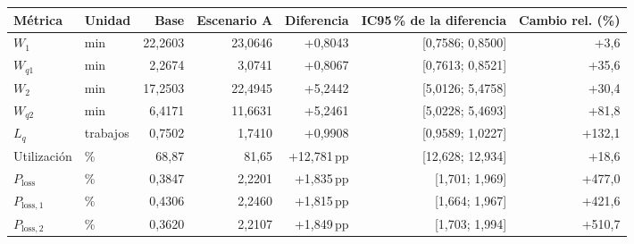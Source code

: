 \begin{tabular}{llrrrrr}
\toprule
Métrica & Unidad & Base & Escenario A & Diferencia & IC95\,\% de la diferencia & Cambio rel. (\%) \\
\midrule
$W_1$ & min & 22,2603 & 23,0646 & +0,8043 & [0,7586; 0,8500] & +3,6 \\
$W_{q1}$ & min & 2,2674 & 3,0741 & +0,8067 & [0,7613; 0,8521] & +35,6 \\
$W_2$ & min & 17,2503 & 22,4945 & +5,2442 & [5,0126; 5,4758] & +30,4 \\
$W_{q2}$ & min & 6,4171 & 11,6631 & +5,2461 & [5,0228; 5,4693] & +81,8 \\
$L_q$ & trabajos & 0,7502 & 1,7410 & +0,9908 & [0,9589; 1,0227] & +132,1 \\
Utilización & \% & 68,87 & 81,65 & +12,781\,pp & [12,628; 12,934] & +18,6 \\
$P_{\text{loss}}$ & \% & 0,3847 & 2,2201 & +1,835\,pp & [1,701; 1,969] & +477,0 \\
$P_{\text{loss},1}$ & \% & 0,4306 & 2,2460 & +1,815\,pp & [1,664; 1,967] & +421,6 \\
$P_{\text{loss},2}$ & \% & 0,3620 & 2,2107 & +1,849\,pp & [1,703; 1,994] & +510,7 \\
\bottomrule
\end{tabular}
